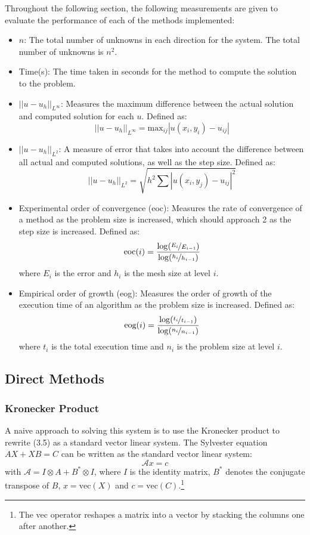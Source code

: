 \documentclass{article}
\numberwithin{equation}{section}
\begin{document}
Throughout the following section, the following measurements are given to evaluate the performance of each of the methods implemented:
\begin{itemize}
\item $n$: The total number of unknowns in each direction for the system. The total number of unknowns is $n^2$.
\item Time(s): The time taken in seconds for the method to compute the solution to the problem.
\item $|| u - u_h ||_{L^\infty} $: Measures the maximum difference between the actual solution and computed solution for each $u$. Defined as:
 \[ || u - u_h ||_{L^\infty} = \text{max}_{ij} | u(x_i, y_i) - u_{ij} | \]
\item $|| u - u_h ||_{L^2} $: A measure of error that takes into account the difference between all actual and computed solutions, as well as the step size. Defined as:
\[ || u - u_h ||_{L^2} = \sqrt{h^2 \sum | u(x_i,y_j) - u_{ij} |^2} \]
\item Experimental order of convergence (eoc): Measures the rate of convergence of a method as the problem size is increased, which should approach 2 as the step size is increased. Defined as:
\[ \text{eoc}(i) = \frac{\log(\nicefrac{E_i}{E_{i-1}})}{\log(\nicefrac{h_i}{h_{i-1}})} \]
where $E_i$ is the error and $h_i$ is the mesh size at level $i$. 
\item Empirical order of growth (eog): Measures the order of growth of the execution time of an algorithm as the problem size is increased. Defined as:
\[ \text{eog}(i) = \frac{\log(\nicefrac{t_{i}}{t_{i-1}})}{\log(\nicefrac{n_{i}}{n_{i-1}})} \]
where $t_i$ is the total execution time and $n_i$ is the problem size at level $i$.
\end{itemize}

\subsection{Direct Methods}

\subsubsection{Kronecker Product}
A naive approach to solving this system is to use the Kronecker product to rewrite (3.5) as a standard vector linear system. The Sylvester equation $AX + XB = C$ can be written as the standard vector linear system:
\begin{equation}
\mathcal{A}x = c
\end{equation}
with $\mathcal{A} = I \otimes A + B^* \otimes I$, where $I$ is the identity matrix, $B^*$ denotes the conjugate transpose of $B$, $x = \text{vec}(X)$ and $c = \text{vec}(C)$.\footnote{The vec operator reshapes a matrix into a vector by stacking the columns one after another.}
\end{document}
